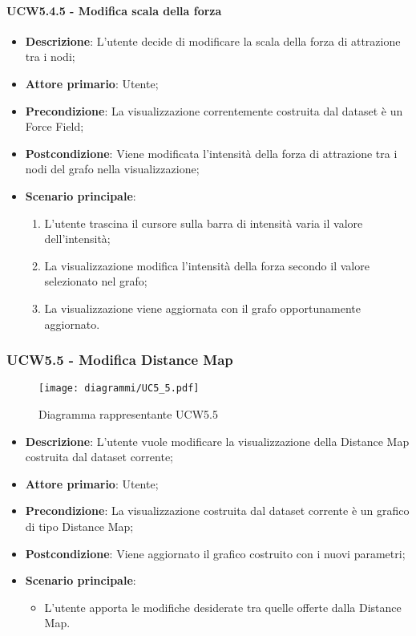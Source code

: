 \paragraph{UCW5.4.5 - Modifica scala della forza}
\label{par:ucw5.4.5}
\begin{itemize}
    \item \textbf{Descrizione}: L’utente decide di modificare la scala della forza di attrazione tra i nodi;


    \item \textbf{Attore primario}: Utente;

    \item \textbf{Precondizione}:   La visualizzazione correntemente costruita dal dataset è un Force Field;
    \item \textbf{Postcondizione}:  Viene modificata l'intensità della forza di attrazione tra i nodi del grafo nella visualizzazione;

	\item \textbf{Scenario principale}:
        \begin{enumerate}
            \item L'utente trascina il cursore sulla barra di intensità varia il valore dell’intensità;
            \item La visualizzazione modifica l'intensità della forza secondo il valore selezionato nel grafo;
            \item La visualizzazione viene aggiornata con il grafo opportunamente aggiornato.
        \end{enumerate}
\end{itemize}

\newpage
\subsubsection{UCW5.5 - Modifica Distance Map}
\label{ssub:ucw5.5}
\begin{figure}[h]
    \centering
    \texttt{[image: diagrammi/UC5\_5.pdf]}
    \caption{Diagramma rappresentante UCW5.5}
    \label{fig:UCW5.5}
\end{figure}

\begin{itemize}
    \item \textbf{Descrizione}: L'utente vuole modificare la visualizzazione della Distance Map costruita dal dataset corrente;
    \item \textbf{Attore primario}: Utente;
    \item \textbf{Precondizione}: La visualizzazione costruita dal dataset corrente è un grafico di tipo Distance Map;
    \item \textbf{Postcondizione}: Viene aggiornato il grafico costruito con i nuovi parametri;
    \item \textbf{Scenario principale}:
    \begin{itemize}
        \item L'utente apporta le modifiche desiderate tra quelle offerte dalla Distance Map.
    \end{itemize}
\end{itemize}

